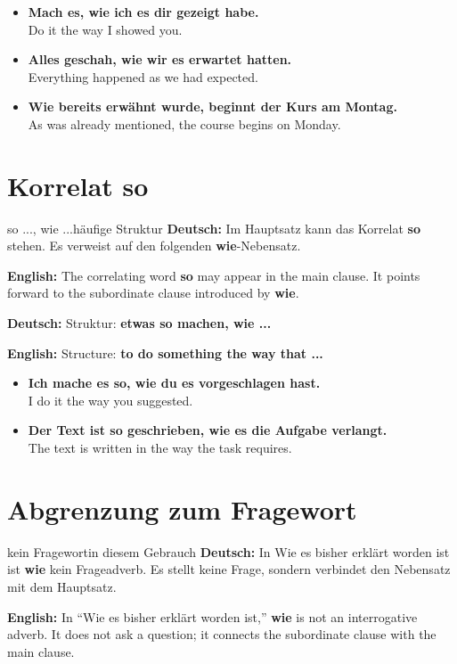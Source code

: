 \documentclass[a4paper,11pt]{article}
\newcommand{\GermanText}[1]{\textbf{Deutsch: }#1\par}
\newcommand{\EnglishText}[1]{{\small\color{SoftGray}\textbf{English: }#1\par}}
\newcommand{\ExampleItem}[2]{\item \textbf{#1}\\{\small\color{SoftGray}#2}}
\begin{document}
\begin{exbox}
\begin{itemize}
\ExampleItem{Mach es, wie ich es dir gezeigt habe.}{Do it the way I showed you.}
\ExampleItem{Alles geschah, wie wir es erwartet hatten.}{Everything happened as we had expected.}
\ExampleItem{Wie bereits erwähnt wurde, beginnt der Kurs am Montag.}{As was already mentioned, the course begins on Monday.}
\end{itemize}
\end{exbox}

\section{Korrelat \glqq so\grqq}

\begin{grammarentry}{so ..., wie ...}{häufige Struktur}
\GermanText{Im Hauptsatz kann das Korrelat \textbf{so} stehen. Es verweist auf den folgenden \textbf{wie}-Nebensatz.}
\EnglishText{The correlating word \textbf{so} may appear in the main clause. It points forward to the subordinate clause introduced by \textbf{wie}.}

\GermanText{Struktur: \textbf{etwas so machen, wie ...}}
\EnglishText{Structure: \textbf{to do something the way that ...}}
\end{grammarentry}

\begin{exbox}
\begin{itemize}
\ExampleItem{Ich mache es so, wie du es vorgeschlagen hast.}{I do it the way you suggested.}
\ExampleItem{Der Text ist so geschrieben, wie es die Aufgabe verlangt.}{The text is written in the way the task requires.}
\end{itemize}
\end{exbox}

\section{Abgrenzung zum Fragewort}

\begin{grammarentry}{kein Fragewort}{in diesem Gebrauch}
\GermanText{In \glqq Wie es bisher erklärt worden ist\grqq{} ist \textbf{wie} kein Frageadverb. Es stellt keine Frage, sondern verbindet den Nebensatz mit dem Hauptsatz.}
\EnglishText{In ``Wie es bisher erklärt worden ist,'' \textbf{wie} is not an interrogative adverb. It does not ask a question; it connects the subordinate clause with the main clause.}
\end{grammarentry}
\end{document}
